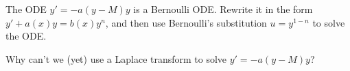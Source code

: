 \begin{problem}
 The ODE $y'=-a(y-M)y$ is a Bernoulli ODE.  Rewrite it in the form $y'+a(x)y=b(x)y^n$, and then use Bernoulli's substitution $u=y^{1-n}$ to solve the ODE.  
\end{problem}
 
\begin{question}
 Why can't we (yet) use a Laplace transform to solve $y'=-a(y-M)y$?
\end{question}















